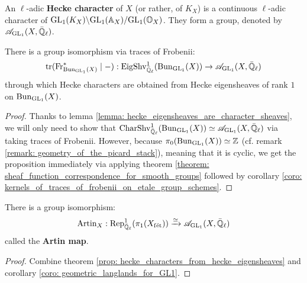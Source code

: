                 \begin{definition} \label{def: hecke_characters}
                    An $\ell$-adic \textbf{Hecke character} of $X$ (or rather, of $K_X$) is a continuous $\ell$-adic character of $\mathrm{GL}_1(K_X)\backslash\mathrm{GL}_1(\mathbb{A}_X)/\mathrm{GL}_1(\mathbb{O}_{X})$. They form a group, denoted by $\mathscr{A}_{\mathrm{GL}_1}(X, \bar{\mathbb{Q}}_{\ell})$.
                \end{definition}
                \begin{proposition} \label{prop: hecke_characters_from_hecke_eigensheaves}
                    There is a group isomorphism via traces of Frobenii:
                        $$\operatorname{tr}(\mathrm{Fr}_{\mathrm{Bun}_{\mathrm{GL}_1}(X)}^* \mid -): \mathrm{Eig}\mathrm{Shv}_{\bar{\mathbb{Q}}_{\ell}}^1(\mathrm{Bun}_{\mathrm{GL}_1}(X)) \to \mathscr{A}_{\mathrm{GL}_1}(X, \bar{\mathbb{Q}}_{\ell})$$
                    through which Hecke characters are obtained from Hecke eigensheaves of rank $1$ on $\mathrm{Bun}_{\mathrm{GL}_1}(X)$.
                \end{proposition}
                    \begin{proof}
                        Thanks to lemma \ref{lemma: hecke_eigensheaves_are_character_sheaves}, we will only need to show that $\mathrm{Char}\mathrm{Shv}_{\bar{\mathbb{Q}}_{\ell}}^1(\mathrm{Bun}_{\mathrm{GL}_1}(X)) \simeq \mathscr{A}_{\mathrm{GL}_1}(X, \bar{\mathbb{Q}}_{\ell})$ via taking traces of Frobenii. However, because $\pi_0(\mathrm{Bun}_{\mathrm{GL}_1}(X)) \simeq \mathbb{Z}$ (cf. remark \ref{remark: geometry_of_the_picard_stack}), meaning that it is cyclic, we get the proposition immediately via applying theorem \ref{theorem: sheaf_function_correspondence_for_smooth_groups} followed by corollary \ref{coro: kernels_of_traces_of_frobenii_on_etale_group_schemes}.
                    \end{proof}
                
                \begin{theorem} \label{theorem: artin_reciprocity_for_function_fields_over_finite_fields}
                    \cite[Theorem VI.5.5]{neukirch_2010_algebraic_number_theory} There is a group isomorphism:
                        $$\mathrm{Artin}_X: \mathrm{Rep}^1_{\bar{\mathbb{Q}}_{\ell}}(\pi_1(X_{\mathrm{f\acute{e}t}})) \xrightarrow[]{\simeq} \mathscr{A}_{\mathrm{GL}_1}(X, \bar{\mathbb{Q}}_{\ell})$$
                    called the \textbf{Artin map}.
                \end{theorem}
                    \begin{proof}
                        Combine theorem \ref{prop: hecke_characters_from_hecke_eigensheaves} and corollary \ref{coro: geometric_langlands_for_GL1}. 
                    \end{proof}
                    
